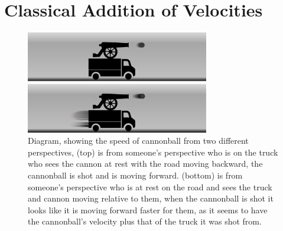 
\section{Classical Addition of Velocities}\label{Section classical velocity addition}

\begin{figure}[ht]
	\centering
	\includegraphics[width=8cm]{images/pdf/lorry_cannonball.pdf}
	\caption{Diagram, showing the speed of cannonball from two different perspectives, (top) is from someone's perspective who is on the truck who sees the cannon at rest with the road moving backward, the cannonball is shot and is moving forward. (bottom) is from someone's perspective who is at rest on the road and sees the truck and cannon moving relative to them, when the cannonball is shot it looks like it is moving forward faster for them, as it seems to have the cannonball's velocity plus that of the truck it was shot from.}
	\label{fig: truck cannonball}
\end{figure}

